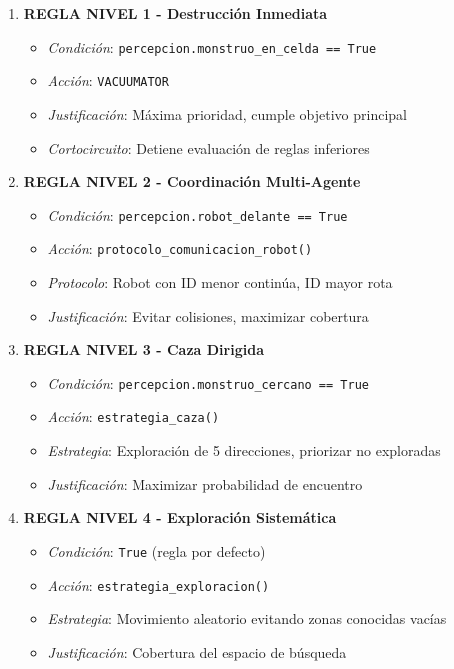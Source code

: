 \documentclass[10pt,twocolumn]{article}
\begin{document}
\begin{enumerate}
\item \textbf{REGLA NIVEL 1 - Destrucción Inmediata}
\begin{itemize}
\item \textit{Condición}: \texttt{percepcion.monstruo\_en\_celda == True}
\item \textit{Acción}: \texttt{VACUUMATOR}
\item \textit{Justificación}: Máxima prioridad, cumple objetivo principal
\item \textit{Cortocircuito}: Detiene evaluación de reglas inferiores
\end{itemize}

\item \textbf{REGLA NIVEL 2 - Coordinación Multi-Agente}
\begin{itemize}
\item \textit{Condición}: \texttt{percepcion.robot\_delante == True}
\item \textit{Acción}: \texttt{protocolo\_comunicacion\_robot()}
\item \textit{Protocolo}: Robot con ID menor continúa, ID mayor rota
\item \textit{Justificación}: Evitar colisiones, maximizar cobertura
\end{itemize}

\item \textbf{REGLA NIVEL 3 - Caza Dirigida}
\begin{itemize}
\item \textit{Condición}: \texttt{percepcion.monstruo\_cercano == True}
\item \textit{Acción}: \texttt{estrategia\_caza()}
\item \textit{Estrategia}: Exploración de 5 direcciones, priorizar no exploradas
\item \textit{Justificación}: Maximizar probabilidad de encuentro
\end{itemize}

\item \textbf{REGLA NIVEL 4 - Exploración Sistemática}
\begin{itemize}
\item \textit{Condición}: \texttt{True} (regla por defecto)
\item \textit{Acción}: \texttt{estrategia\_exploracion()}
\item \textit{Estrategia}: Movimiento aleatorio evitando zonas conocidas vacías
\item \textit{Justificación}: Cobertura del espacio de búsqueda
\end{itemize}
\end{enumerate}
\end{document}
